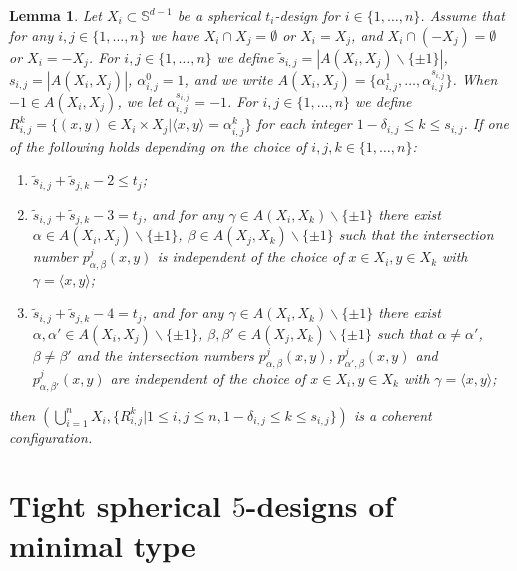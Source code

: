 \documentclass[11pt]{article}
\newtheorem{lemma}{Lemma}[section]
\theoremstyle{definition}
\theoremstyle{remark}
\begin{document}
\begin{lemma}{\rm \cite[Theorem 2.6]{Suda10}}\label{Suda-thm26}
Let $X_i\subset\mathbb{S}^{d-1}$ be a spherical $t_i$-design for $i\in \{1,\ldots,n\}$. Assume that for any $i, j \in  \{1,\ldots,n\}$ we have $X_i\cap X_j=\emptyset$ or $X_i=X_j$, and $X_i\cap (-X_j) =\emptyset$ or $X_i=-X_j$. 
For $i, j \in  \{1,\ldots,n\}$ we define $\widetilde{s}_{i,j}=|A(X_i, X_j)\backslash \{\pm 1\}|$, $s_{i,j}=|A(X_i, X_j)|$, $\alpha_{i,j}^0=1$, and we write $A(X_i, X_j)=\{\alpha_{i,j}^{1},\ldots,\alpha_{i,j}^{{s}_{i,j}}\}$. When $-1\in A(X_i, X_j)$, we let $\alpha^{s_{i,j}}_{i,j}=-1$. For $i, j \in  \{1,\ldots,n\}$ we define $R^k_{i,j}=\{({x},   {y})\in  X_i\times  X_j | \langle   {x},   {y}\rangle  = \alpha_{i,j}^k\}$ for each integer $1-\delta_{i,j}\leq k\leq s_{i,j}$. If one of the following holds depending on the choice of $i,j,k \in  \{1,\ldots,n\}$: 

\begin{enumerate}
\item[\rm (i)] $\widetilde{s}_{i,j}+\widetilde{s}_{j,k}-2 \leq t_j$;

\item[\rm (ii)] $\widetilde{s}_{i,j}+\widetilde{s}_{j,k}-3 = t_j$, and for any $\gamma \in  A(X_i, X_k)\backslash \{\pm 1\}$ there exist $\alpha \in  A(X_i, X_j)\backslash \{\pm 1\}$, $\beta \in  A(X_j, X_k)\backslash \{\pm 1\}$ such that the intersection number $p^j_{\alpha,\beta}(  {x},   {y})$ is independent of the choice of $  {x}\in X_i,   {y} \in  X_k$ with $\gamma=\langle   {x},  {y}\rangle$;

\item[\rm (iii)] $\widetilde{s}_{i,j}+\widetilde{s}_{j,k}-4 = t_j$, and for any $\gamma \in  A(X_i, X_k)\backslash \{\pm 1\}$ there exist $\alpha,\alpha' \in  A(X_i, X_j)\backslash \{\pm 1\}$, $\beta,\beta' \in  A(X_j, X_k)\backslash \{\pm 1\}$ such that $\alpha\neq \alpha'$, $\beta\neq \beta'$ and the intersection numbers $p^j_{\alpha,\beta}(  {x},   {y})$, $p^j_{\alpha',\beta}(  {x},   {y})$ and $p^j_{\alpha,\beta'}(  {x},   {y})$ are independent of the choice of $  {x}\in X_i,   {y} \in  X_k$ with $\gamma=\langle   {x},  {y}\rangle$;
\end{enumerate}
then $(\bigcup_{i=1}^{n}X_i,\{R^k_{i,j} | 1\leq i, j \leq n, 1-\delta_{i,j}\leq k\leq s_{i,j}\})$ is a coherent configuration.

\end{lemma}

\section{Tight spherical $5$-designs of minimal type}
\end{document}
